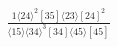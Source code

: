\documentclass[varwidth, border=5pt]{standalone}
\begin{document}
\begin{my}
$\begin{gathered}
\scriptscriptstyle\frac{1⟨24⟩^2[35]⟨23⟩[24]^2}{⟨15⟩⟨34⟩^3[34]⟨45⟩[45]}
\end{gathered}$
\end{my}
\end{document}
